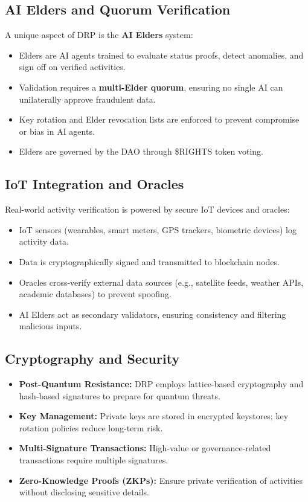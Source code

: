 \documentclass[11pt,a4paper]{article}
\begin{document}
\subsection{AI Elders and Quorum Verification}
A unique aspect of DRP is the \textbf{AI Elders} system:
\begin{itemize}
    \item Elders are AI agents trained to evaluate status proofs, detect anomalies, and sign off on verified activities.  
    \item Validation requires a \textbf{multi-Elder quorum}, ensuring no single AI can unilaterally approve fraudulent data.  
    \item Key rotation and Elder revocation lists are enforced to prevent compromise or bias in AI agents.  
    \item Elders are governed by the DAO through \$RIGHTS token voting.  
\end{itemize}

\subsection{IoT Integration and Oracles}
Real-world activity verification is powered by secure IoT devices and oracles:
\begin{itemize}
    \item IoT sensors (wearables, smart meters, GPS trackers, biometric devices) log activity data.  
    \item Data is cryptographically signed and transmitted to blockchain nodes.  
    \item Oracles cross-verify external data sources (e.g., satellite feeds, weather APIs, academic databases) to prevent spoofing.  
    \item AI Elders act as secondary validators, ensuring consistency and filtering malicious inputs.  
\end{itemize}

\subsection{Cryptography and Security}
\begin{itemize}
    \item \textbf{Post-Quantum Resistance:} DRP employs lattice-based cryptography and hash-based signatures to prepare for quantum threats.  
    \item \textbf{Key Management:} Private keys are stored in encrypted keystores; key rotation policies reduce long-term risk.  
    \item \textbf{Multi-Signature Transactions:} High-value or governance-related transactions require multiple signatures.  
    \item \textbf{Zero-Knowledge Proofs (ZKPs):} Ensure private verification of activities without disclosing sensitive details.  
\end{itemize}
\end{document}

